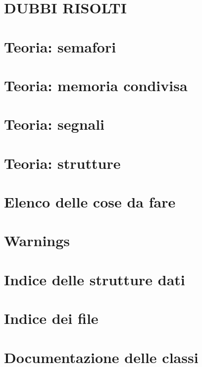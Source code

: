 \documentclass[twoside]{book}
\newcommand{\+}{\discretionary{\mbox{\scriptsize$\hookleftarrow$}}{}{}}
\begin{document}
\chapter{D\+U\+B\+BI R\+I\+S\+O\+L\+TI}
\label{md_theory_questions_questions}

\chapter{Teoria\+: semafori}
\label{md_theory_semaphores_semaphores}

\chapter{Teoria\+: memoria condivisa}
\label{md_theory_shared_memory_shared_memory}

\chapter{Teoria\+: segnali}
\label{md_theory_signals_signals}

\chapter{Teoria\+: strutture}
\label{md_theory_structures_structures}

\chapter{Elenco delle cose da fare}
\label{todo}

\chapter{Warnings}
\label{warning}

\chapter{Indice delle strutture dati}

\chapter{Indice dei file}

\chapter{Documentazione delle classi}



\end{document}
